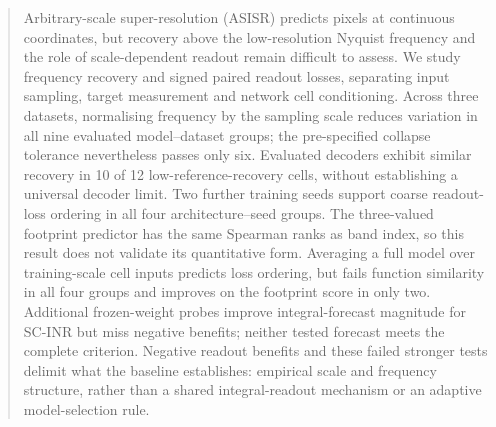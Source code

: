 \begin{abstract}
Arbitrary-scale super-resolution (ASISR) predicts pixels at continuous coordinates, but recovery above the low-resolution Nyquist frequency and the role of scale-dependent readout remain difficult to assess. We study frequency recovery and signed paired readout losses, separating input sampling, target measurement and network cell conditioning. Across three datasets, normalising frequency by the sampling scale reduces variation in all nine evaluated model--dataset groups; the pre-specified collapse tolerance nevertheless passes only six. Evaluated decoders exhibit similar recovery in 10 of 12 low-reference-recovery cells, without establishing a universal decoder limit. Two further training seeds support coarse readout-loss ordering in all four architecture--seed groups. The three-valued footprint predictor has the same Spearman ranks as band index, so this result does not validate its quantitative form. Averaging a full model over training-scale cell inputs predicts loss ordering, but fails function similarity in all four groups and improves on the footprint score in only two. Additional frozen-weight probes improve integral-forecast magnitude for SC-INR but miss negative benefits; neither tested forecast meets the complete criterion. Negative readout benefits and these failed stronger tests delimit what the baseline establishes: empirical scale and frequency structure, rather than a shared integral-readout mechanism or an adaptive model-selection rule.
\end{abstract}
